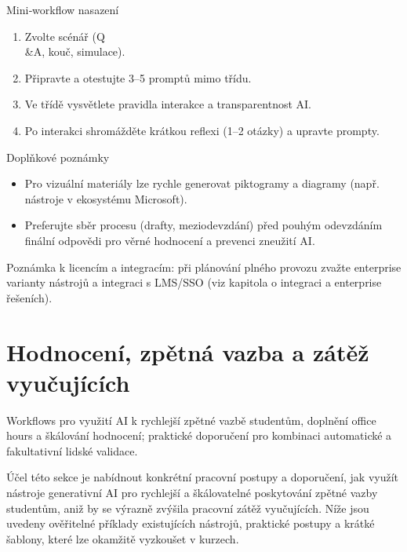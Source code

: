 \documentclass{report}%
\begin{document}
Mini‑workflow nasazení
\begin{enumerate}
  \item Zvolte scénář (Q\\ \&A, kouč, simulace).
  \item Připravte a otestujte 3–5 promptů mimo třídu.
  \item Ve třídě vysvětlete pravidla interakce a transparentnost AI.
  \item Po interakci shromážděte krátkou reflexi (1–2 otázky) a upravte prompty.
\end{enumerate}

Doplňkové poznámky
\begin{itemize}
  \item Pro vizuální materiály lze rychle generovat piktogramy a diagramy (např. nástroje v ekosystému Microsoft).
  \item Preferujte sběr procesu (drafty, meziodevzdání) před pouhým odevzdáním finální odpovědi pro věrné hodnocení a prevenci zneužití AI. \cite{kb_ai_101_tipu_pdf_04e4a115_page_8_1}
\end{itemize}

Poznámka k licencím a integracím: při plánování plného provozu zvažte enterprise varianty nástrojů a integraci s LMS/SSO (viz kapitola o integraci a enterprise řešeních).%

%
\section{Hodnocení, zpětná vazba a zátěž vyučujících}%
Workflows pro využití AI k rychlejší zpětné vazbě studentům, doplnění office hours a škálování hodnocení; praktické doporučení pro kombinaci automatické a fakultativní lidské validace.%


%
Účel této sekce je nabídnout konkrétní pracovní postupy a doporučení, jak využít nástroje generativní AI pro rychlejší a škálovatelné poskytování zpětné vazby studentům, aniž by se výrazně zvýšila pracovní zátěž vyučujících. Níže jsou uvedeny ověřitelné příklady existujících nástrojů, praktické postupy a krátké šablony, které lze okamžitě vyzkoušet v kurzech.
\end{document}
